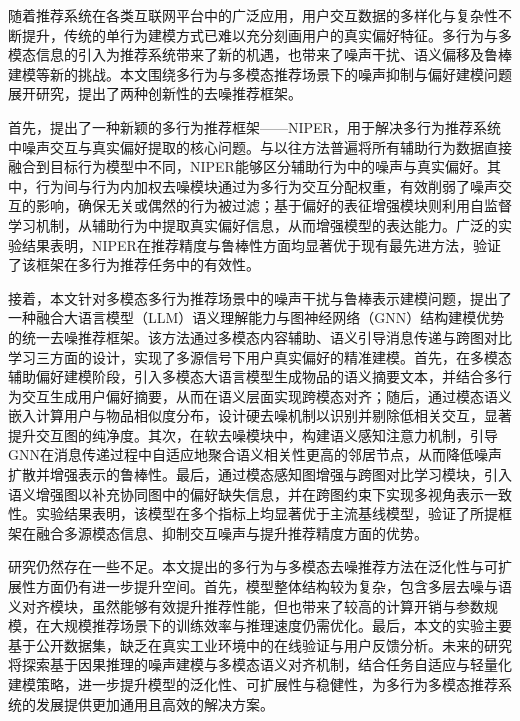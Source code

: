 
\begin{conclusions}
随着推荐系统在各类互联网平台中的广泛应用，用户交互数据的多样化与复杂性不断提升，传统的单行为建模方式已难以充分刻画用户的真实偏好特征。多行为与多模态信息的引入为推荐系统带来了新的机遇，也带来了噪声干扰、语义偏移及鲁棒建模等新的挑战。本文围绕多行为与多模态推荐场景下的噪声抑制与偏好建模问题展开研究，提出了两种创新性的去噪推荐框架。

首先，提出了一种新颖的多行为推荐框架——NIPER，用于解决多行为推荐系统中噪声交互与真实偏好提取的核心问题。与以往方法普遍将所有辅助行为数据直接融合到目标行为模型中不同，NIPER能够区分辅助行为中的噪声与真实偏好。其中，行为间与行为内加权去噪模块通过为多行为交互分配权重，有效削弱了噪声交互的影响，确保无关或偶然的行为被过滤；基于偏好的表征增强模块则利用自监督学习机制，从辅助行为中提取真实偏好信息，从而增强模型的表达能力。广泛的实验结果表明，NIPER在推荐精度与鲁棒性方面均显著优于现有最先进方法，验证了该框架在多行为推荐任务中的有效性。

接着，本文针对多模态多行为推荐场景中的噪声干扰与鲁棒表示建模问题，提出了一种融合大语言模型（LLM）语义理解能力与图神经网络（GNN）结构建模优势的统一去噪推荐框架。该方法通过多模态内容辅助、语义引导消息传递与跨图对比学习三方面的设计，实现了多源信号下用户真实偏好的精准建模。首先，在多模态辅助偏好建模阶段，引入多模态大语言模型生成物品的语义摘要文本，并结合多行为交互生成用户偏好摘要，从而在语义层面实现跨模态对齐；随后，通过模态语义嵌入计算用户与物品相似度分布，设计硬去噪机制以识别并剔除低相关交互，显著提升交互图的纯净度。其次，在软去噪模块中，构建语义感知注意力机制，引导GNN在消息传递过程中自适应地聚合语义相关性更高的邻居节点，从而降低噪声扩散并增强表示的鲁棒性。最后，通过模态感知图增强与跨图对比学习模块，引入语义增强图以补充协同图中的偏好缺失信息，并在跨图约束下实现多视角表示一致性。实验结果表明，该模型在多个指标上均显著优于主流基线模型，验证了所提框架在融合多源模态信息、抑制交互噪声与提升推荐精度方面的优势。

研究仍然存在一些不足。本文提出的多行为与多模态去噪推荐方法在泛化性与可扩展性方面仍有进一步提升空间。首先，模型整体结构较为复杂，包含多层去噪与语义对齐模块，虽然能够有效提升推荐性能，但也带来了较高的计算开销与参数规模，在大规模推荐场景下的训练效率与推理速度仍需优化。最后，本文的实验主要基于公开数据集，缺乏在真实工业环境中的在线验证与用户反馈分析。未来的研究将探索基于因果推理的噪声建模与多模态语义对齐机制，结合任务自适应与轻量化建模策略，进一步提升模型的泛化性、可扩展性与稳健性，为多行为多模态推荐系统的发展提供更加通用且高效的解决方案。

\end{conclusions}
